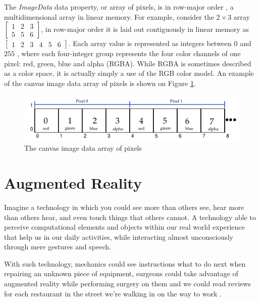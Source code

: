 The \textit{ImageData} data property, or array of pixels, is in row-major order \cite{Canvas2013} \cite{MDN2013}, a multidimensional array in linear memory. For example, consider the $2\times3$ array $\begin{bmatrix}
1 & 2 & 3\\
5 & 5 & 6
\end{bmatrix}$, in row-major order it is laid out contiguously in linear memory as $\begin{bmatrix}
1 & 2 & 3 & 4 & 5 & 6
\end{bmatrix}$. Each array value is represented as integers between $0$ and $255$ \cite{Canvas2013} \cite{MDN2013}, where each four-integer group represents the four color channels of one pixel: red, green, blue and alpha (RGBA). While RGBA \cite{Gonzalez2007} is sometimes described as a color space, it is actually simply a use of the RGB \cite{Gonzalez2007} color model. An example of the canvas \cite{Canvas2013} image data array of pixels is shown on Figure \ref{figure:imagedata_array}.

\begin{figure}[!htb]
  \centering
  \includegraphics[width=\linewidth]{chapters/basic_concepts/imagedata_array.pdf}
  \caption{The canvas image data array of pixels}
  \label{figure:imagedata_array}
\end{figure}



\section{Augmented Reality} %
\label{sec:basic_concepts:augmented_reality}

Imagine a technology in which you could see more than others see, hear more than others hear, and even touch things that others cannot. A technology able to perceive computational elements and objects within our real world experience that help us in our daily activities, while interacting almost unconsciously through mere gestures and speech.

With such technology, mechanics could see instructions what to do next when repairing an unknown piece of equipment, surgeons could take advantage of augmented reality while performing surgery on them and we could read reviews for each restaurant in the street we're walking in on the way to work \cite{Krevelen2010}.

